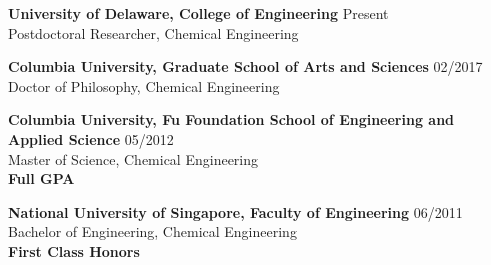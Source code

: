 {\bf University of Delaware, College of Engineering} \hfill {Present} \\ 
Postdoctoral Researcher, Chemical Engineering


{\bf Columbia University, Graduate School of Arts and Sciences} \hfill {02/2017} \\ 
Doctor of Philosophy, Chemical Engineering


{\bf Columbia University, Fu Foundation School of Engineering and Applied Science} \hfill {05/2012} \\ 
Master of Science, Chemical Engineering\\
{\bf Full GPA}%


{\bf National University of Singapore, Faculty of Engineering} \hfill {06/2011}\\ 
Bachelor of Engineering, Chemical Engineering\\
{\bf First Class Honors}